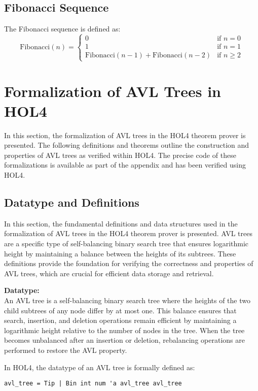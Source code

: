 \documentclass[12pt]{article}
\begin{document}
\subsection{Fibonacci Sequence}
The Fibonacci sequence is defined as:
\[
\text{Fibonacci}(n) =
\begin{cases}
0 & \text{if } n = 0 \\
1 & \text{if } n = 1 \\
\text{Fibonacci}(n-1) + \text{Fibonacci}(n-2) & \text{if } n \geq 2
\end{cases}
\]

\section{Formalization of AVL Trees in HOL4}

In this section, the formalization of AVL trees in the HOL4 theorem prover is presented. The following definitions and theorems outline the construction and properties of AVL trees as verified within HOL4. The precise code of these formalizations is available as part of the appendix and has been verified using HOL4.

\subsection{Datatype and Definitions}

In this section, the fundamental definitions and data structures used in the formalization of AVL trees in the HOL4 theorem prover is presented. AVL trees are a specific type of self-balancing binary search tree that ensures logarithmic height by maintaining a balance between the heights of its subtrees. These definitions provide the foundation for verifying the correctness and properties of AVL trees, which are crucial for efficient data storage and retrieval.

\textbf{Datatype:} \\
An AVL tree is a self-balancing binary search tree where the heights of the two child subtrees of any node differ by at most one. This balance ensures that search, insertion, and deletion operations remain efficient by maintaining a logarithmic height relative to the number of nodes in the tree. When the tree becomes unbalanced after an insertion or deletion, rebalancing operations are performed to restore the AVL property.

In HOL4, the datatype of an AVL tree is formally defined as:

\begin{verbatim}
avl_tree = Tip | Bin int num 'a avl_tree avl_tree
\end{verbatim}
\end{document}
